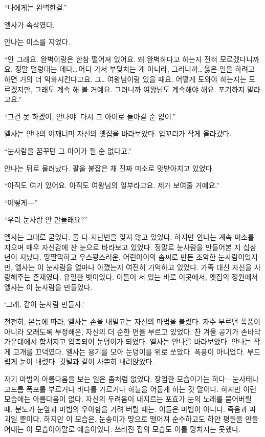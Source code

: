 ``나에게는 완벽한걸.''

엘사가 속삭였다.

안나는 미소를 지었다.

``안 그래요. 완벽이랑은 한참 떨어져 있어요. 왜 완벽하다고 하는지 전혀 모르겠다니까요. 정말 덜렁대는 데다\ldots\,어디 가서 부딪치는 게 아니라, 그러니까\ldots\,옳은 일을 하려고 하면 거의 더 악화시킨다고요. 그\ldots\,여왕님이랑 있을 때요. 어떻게 도와야 하는지는 모르겠지만, 그래도 계속 해 볼 거예요. 그러니까 여왕님도 계속해야 해요. 포기하지 말라고요.''

``그건 못 하겠어, 안나야. 다시 그 아이로 돌아갈 순 없어.''

엘사는 안나의 어깨너머 자신의 옛집을 바라보았다. 입꼬리가 작게 올라갔다.

``눈사람을 꿈꾸던 그 아이가 될 순 없다고.''

안나는 뒤로 물러났다. 팔을 붙잡은 채 진짜 미소로 맞받아치고 있었다.

``아직도 여기 있어요. 아직도 여왕님의 일부라고요. 제가 보여줄 거예요.''

``어떻게—''

``우리 눈사람 안 만들래요?''

엘사는 그대로 굳었다. 둘 다 지난번을 잊지 않고 있었다. 하지만 안나는 계속 미소를 지으며 매우 자신감에 찬 눈으로 바라보고 있었다. 정말로 눈사람을 만들어본 지 십삼 년이 지났다. 땅딸막하고 우스꽝스러운, 어린아이의 솜씨로 만든 조악한 눈사람이었지만, 엘사는 이 눈사람을 얼마나 아꼈는지 여전히 기억하고 있었다. 가족 대신 자신을 사랑해주는 존재였다. 유일한 벗이었다. 이들이 서 있는 바로 이곳에서, 옛집의 정원에서 엘사는 이 눈사람을 만들었다.

`그래, 같이 눈사람 만들자.'

천천히, 본능에 따라, 엘사는 손을 내밀고는 자신의 마법을 불렀다. 자주 부르던 폭풍이 아니라 오래도록 부정해온, 자신의 더 순한 면을 부르고 있었다. 찬 겨울 공기가 손바닥 가운데에서 합쳐지고 압축되어 눈덩이가 되었다. 엘사는 안나를 바라보았다. 안나는 작게 고개를 끄덕였다. 엘사는 용기를 모아 눈덩이를 위로 쏘았다. 폭풍이 아니었다. 부드럽게 눈이 내렸다. 깃털과 같이 사뿐히 내려앉았다.

자기 마법의 아름다움을 보는 일은 좀처럼 없었다. 장엄한 모습이기는 하다—눈사태나 고드름 폭포를 부르거나 바다를 가르거나 하늘을 어둡게 하는 것 말이다. 하지만 이런 모습에는 아름다움이 없다. 자신의 두려움이 내지르는 포효가 눈의 노래를 묻어버릴 때, 분노가 눈앞과 마법의 우아함을 가려 버릴 때는. 이들은 마법이 아니다. 죽음과 파괴일 뿐이다. 하지만 이 모습은, 눈송이가 땅으로 떨어져 순수하고도 하얀 평원을 만들어내는 이 모습이야말로 예술이었다. 쓰러진 집의 모습도 이를 망치지는 못했다.

